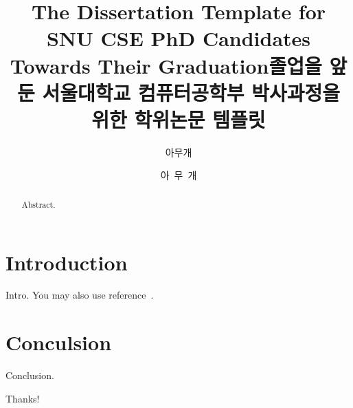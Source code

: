 \documentclass[oneside,phd]{snuthesis}
\title{The Dissertation Template for SNU CSE PhD Candidates Towards Their Graduation}
\title*{졸업을 앞둔 서울대학교 컴퓨터공학부 박사과정을 위한 학위논문 템플릿}
\author{아무개}
\author*{아~무~개} %
\begin{document}
\makefrontcover

\iffalse

\thispagestyle{empty}
\newpage
\mbox{}
\newpage

\makefrontcover
\makeapproval

\fi

\cleardoublepage

\begin{abstract}
	Abstract.
\end{abstract}

\tableofcontents

\cleardoublepage

\chapter{Introduction}

Intro.  You may also use reference~\cite{PhilHowardPhD}.

\chapter{Conculsion}\label{chp:conclusion}

Conclusion.

%




\acknowledgement
Thanks!
\end{document}
